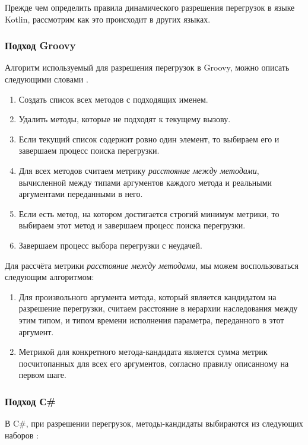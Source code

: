 Прежде чем определить правила динамического разрешения перегрузок в языке Kotlin, рассмотрим как это происходит в других языках.

\subsubsection{Подход Groovy}

Алгоритм используемый для разрешения перегрузок в Groovy, можно описать следующими словами \cite{groovy:selectingOverloadsAtRuntime}.

\begin{enumerate}
    \item Создать список всех методов с подходящих именем.
    \item Удалить методы, которые не подходят к текущему вызову.
    \item Если текущий список содержит ровно один элемент, то выбираем его и завершаем процесс поиска перегрузки.
    \item Для всех методов считаем метрику \textit{расстояние между методами}, вычисленной между типами аргументов каждого метода и реальными аргументами переданными в него.
    \item Если есть метод, на котором достигается строгий минимум метрики, то выбираем этот метод и завершаем процесс поиска перегрузки.
    \item Завершаем процесс выбора перегрузки с неудачей.
\end{enumerate}

Для рассчёта метрики \textit{расстояние между методами}, мы можем воспользоваться следующим алгоритмом:
\begin{enumerate}
    \item Для произвольного аргумента метода, который является кандидатом на разрешение перегрузки, считаем расстояние в иерархии наследования между этим типом, и типом времени исполнения параметра, переданного в этот аргумент.
    \item Метрикой для конкретного метода-кандидата является сумма метрик посчитопанных для всех его аргументов, согласно правилу описанному на первом шаге.
\end{enumerate}


\subsubsection{Подход С{\#}}

В C{\#}, при разрешении перегрузок, методы-кандидаты выбираются из следующих наборов \cite{csharp:languageSpecification}:

